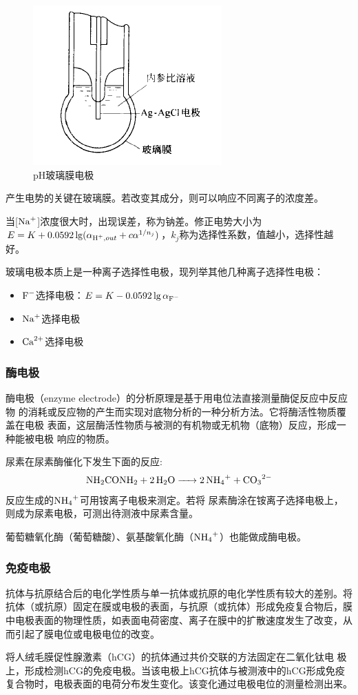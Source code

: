 \begin{figure}[!h]
	\centering
	\includegraphics[width=0.4\linewidth]{image/chp7_glass_electrode}
	\caption{pH玻璃膜电极}
	\label{fig:chp7glasselectrode}
\end{figure}

产生电势的关键在玻璃膜。若改变其成分，则可以响应不同离子的浓度差。

当[$\ce{Na+}$]浓度很大时，出现误差，称为钠差。修正电势大小为$E=K+0.0592\lg ( {\alpha_{\ce{H+},out}}+c\alpha^{1/n_j})$，$k_j$称为选择性系数，值越小，选择性越好。

玻璃电极本质上是一种离子选择性电极，现列举其他几种离子选择性电极：
\begin{itemize}
	\item $\ce{F-}$选择电极：$E=K-0.0592\lg {\alpha_{\ce{F-}}}$
	\item $\ce{Na+}$选择电极
	\item $\ce{Ca^2+}$选择电极
\end{itemize}

\subsubsection{酶电极}
酶电极（enzyme electrode）的分析原理是基于用电位法直接测量酶促反应中反应物
的消耗或反应物的产生而实现对底物分析的一种分析方法。它将酶活性物质覆盖在电极
表面，这层酶活性物质与被测的有机物或无机物（底物）反应，形成一种能被电极
响应的物质。
\begin{example}
	尿素在尿素酶催化下发生下面的反应:
	$$\ce{NH2CONH2 + 2H2O -> 2NH4+ + CO3^2-}$$
	反应生成的$\ce{NH4+}$可用铵离子电极来测定。若将
	尿素酶涂在铵离子选择电极上，则成为尿素电极，可测出待测液中尿素含量。
	
	葡萄糖氧化酶（葡萄糖酸）、氨基酸氧化酶（$\ce{NH4+}$）也能做成酶电极。
\end{example}

\subsubsection{免疫电极}
抗体与抗原结合后的电化学性质与单一抗体或抗原的电化学性质有较大的差别。将抗体（或抗原）固定在膜或电极的表面，与抗原（或抗体）形成免疫复合物后，膜中电极表面的物理性质，如表面电荷密度、离子在膜中的扩散速度发生了改变，从而引起了膜电位或电极电位的改变。
\begin{example}
	将人绒毛膜促性腺激素（hCG）的抗体通过共价交联的方法固定在二氧化钛电
	极上，形成检测hCG的免疫电极。当该电极上hCG抗体与被测液中的hCG形成免疫复合物时，电极表面的电荷分布发生变化。该变化通过电极电位的测量检测出来。
\end{example}


